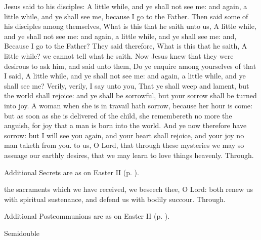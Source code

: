  Jesus said to his disciples: A little while, and ye shall not see me: and again, a little while, and ye shall see me, because I go to the Father. Then said some of his disciples among themselves, What is this that he saith unto us, A little while, and ye shall not see me: and again, a little while, and ye shall see me: and, Because I go to the Father? They said therefore, What is this that he saith, A little while? we cannot tell what he saith. Now Jesus knew that they were desirous to ask him, and said unto them, Do ye enquire among yourselves of that I said, A little while, and ye shall not see me: and again, a little while, and ye shall see me? Verily, verily, I say unto you, That ye shall weep and lament, but the world shall rejoice: and ye shall be sorrowful, but your sorrow shall be turned into joy. A woman when she is in travail hath sorrow, because her hour is come: but as soon as she is delivered of the child, she remembereth no more the anguish, for joy that a man is born into the world. And ye now therefore have sorrow: but I will see you again, and your heart shall rejoice, and your joy no man taketh from you.
\secret
{} to us, O Lord, that through these mysteries we may so assuage our earthly desires, that we may learn to love things heavenly. Through.

\begin{rubric}
    Additional Secrets are as on Easter II (p. \pageref{EasterIISecret}).
\end{rubric}
\postcommunion
{} the sacraments which we have received, we beseech thee, O Lord: both renew us with spiritual sustenance, and defend us with bodily succour. Through.
\begin{rubric}
    Additional Postcommunions are as on Easter II (p. \pageref{EasterIIPostcommunion}).
\end{rubric}

\begin{inhead}
    {Semidouble}
\end{inhead}
\par\noindent
{}

